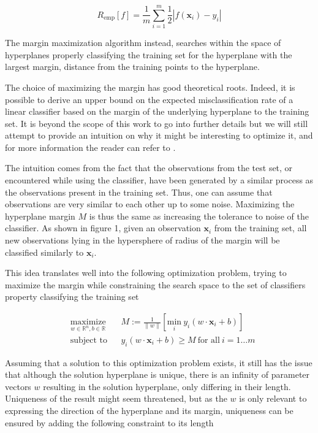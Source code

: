 \begin{equation}
  R_{\text{emp}}[f] = \frac{1}{m}\sum^m_{i=1}\frac{1}{2}|f(\mathbf{x}_i) - y_i|
\end{equation}

The margin maximization algorithm instead, searches within the space of hyperplanes properly classifying the training set for the hyperplane with the largest margin, distance from the training points to the hyperplane.

The choice of maximizing the margin has good theoretical roots. Indeed, it is possible to derive an upper bound on the expected misclassification rate of a linear classifier based on the margin of the underlying hyperplane to the training set. It is beyond the scope of this work to go into further details but we will still attempt to provide an intuition on why it might be interesting to optimize it, and for more information the reader can refer to \cite{Vapnik:1995:NSL:211359}.

The intuition comes from the fact that the observations from the test set, or encountered while using the classifier, have been generated by a similar process as the observations present in the training set. Thus, one can assume that observations are very similar to each other up to some noise. Maximizing the hyperplane margin
$M$ is thus the same as increasing the tolerance to noise of the classifier. As shown in figure 1, given an observation $\mathbf{x}_i$ from the training set, all new observations lying in the hypersphere of radius of the margin will be classified similarly to $\mathbf{x}_i$.

This idea translates well into the following optimization problem, trying to maximize the margin while constraining the search space to the set of classifiers property classifying the training set

\begin{equation}
  \begin{aligned}
    &\underset{w \in \mathbb{R}^n, b \in \mathbb{R}} {\text{maximize}}
    & & M := \frac{1}{\|w\|} \left[\underset{i} {\text{min}}\ 
    y_i(w \cdot \mathbf{x}_i + b)\right]\\
    &\text{subject to}
    & &y_i(w \cdot \mathbf{x}_i + b) \ge M\ \text{for all}\ i = 1 \dotsc m
  \end{aligned}
\end{equation}

Assuming that a solution to this optimization problem exists, it still has the issue that although the solution hyperplane is unique, there is an infinity of parameter vectors $w$ resulting in the solution hyperplane, only differing in their length. Uniqueness of the result might seem threatened, but as the $w$ is only relevant to expressing the direction of the hyperplane and its margin, uniqueness can be ensured by adding the following constraint to its length

